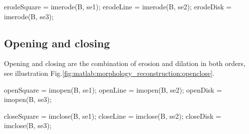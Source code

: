 \begin{matlab}
erodeSquare = imerode(B, se1);
erodeLine = imerode(B, se2);
erodeDisk = imerode(B, se3);
\end{matlab}

\subsection{Opening and closing}
Opening and closing are the combination of erosion and dilation in both orders, see illustration Fig.\ref{fig:matlab:morphology_reconstruction:openclose}.
\begin{matlab}
openSquare = imopen(B, se1);
openLine = imopen(B, se2);
openDisk = imopen(B, se3);
\end{matlab}

\begin{matlab}
closeSquare = imclose(B, se1);
closeLine = imclose(B, se2);
closeDisk = imclose(B, se3);
\end{matlab}


